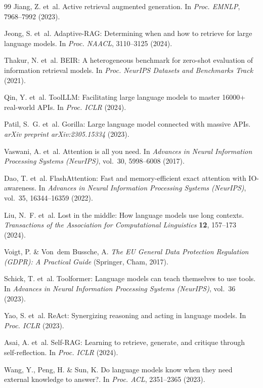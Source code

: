 \documentclass[fleqn,10pt]{article}
\begin{document}
\begin{thebibliography}{99}
Jiang, Z. et~al. Active retrieval augmented generation. In \textit{Proc. EMNLP}, 7968--7992 (2023).

Jeong, S. et~al. Adaptive-RAG: Determining when and how to retrieve for large language models. In \textit{Proc. NAACL}, 3110--3125 (2024).

Thakur, N. et~al. BEIR: A heterogeneous benchmark for zero-shot evaluation of information retrieval models. In \textit{Proc. NeurIPS Datasets and Benchmarks Track} (2021).

Qin, Y. et~al. ToolLLM: Facilitating large language models to master 16000+ real-world APIs. In \textit{Proc. ICLR} (2024).

Patil, S.~G. et~al. Gorilla: Large language model connected with massive APIs. \textit{arXiv preprint arXiv:2305.15334} (2023).

Vaswani, A. et~al. Attention is all you need. In \textit{Advances in Neural Information Processing Systems (NeurIPS)}, vol.~30, 5998--6008 (2017).

Dao, T. et~al. FlashAttention: Fast and memory-efficient exact attention with IO-awareness. In \textit{Advances in Neural Information Processing Systems (NeurIPS)}, vol.~35, 16344--16359 (2022).

Liu, N.~F. et~al. Lost in the middle: How language models use long contexts. \textit{Transactions of the Association for Computational Linguistics} \textbf{12}, 157--173 (2024).

Voigt, P. \& Von~dem Bussche, A. \textit{The EU General Data Protection Regulation (GDPR): A Practical Guide} (Springer, Cham, 2017).

Schick, T. et~al. Toolformer: Language models can teach themselves to use tools. In \textit{Advances in Neural Information Processing Systems (NeurIPS)}, vol.~36 (2023).

Yao, S. et~al. ReAct: Synergizing reasoning and acting in language models. In \textit{Proc. ICLR} (2023).

Asai, A. et~al. Self-RAG: Learning to retrieve, generate, and critique through self-reflection. In \textit{Proc. ICLR} (2024).

Wang, Y., Peng, H. \& Sun, K. Do language models know when they need external knowledge to answer?. In \textit{Proc. ACL}, 2351--2365 (2023).


\end{thebibliography}
\end{document}
